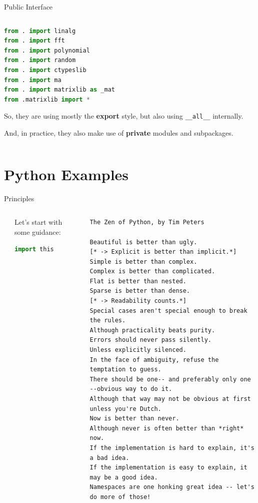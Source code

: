 \documentclass[9pt]{beamer}
\begin{document}
\begin{frame}[fragile]{Public Interface}
\begin{columns}
\begin{column}{0.47\textwidth}
\begin{lstlisting}[language=Python,style=mystyle,firstnumber=140]
from . import linalg
from . import fft
from . import polynomial
from . import random
from . import ctypeslib
from . import ma
from . import matrixlib as _mat
from .matrixlib import *\end{lstlisting}
        So, they are using mostly the \textbf{export} style, but also using
        \texttt{\_\_all\_\_} internally.
        \begin{flushright}
            \footnotesize
            \hspace*{15em}And, in practice, they also make use of
            \textbf{private} modules and subpackages.
        \end{flushright}
        \end{column}
    \end{columns}
\end{frame}

\section{Python Examples}


\begin{frame}[fragile]{Principles}
    \vspace*{20pt}
    \begin{columns}
        \begin{column}{0.02\textwidth}
        \end{column}
        \begin{column}{0.38\textwidth}
            Let's start with some guidance:
            \begin{lstlisting}[language=Python,style=mystyle]
import this\end{lstlisting}
        \end{column}
        \begin{column}{0.6\textwidth}
            \begin{lstlisting}[style=mystyle]
The Zen of Python, by Tim Peters

Beautiful is better than ugly.
[* -> Explicit is better than implicit.*]
Simple is better than complex.
Complex is better than complicated.
Flat is better than nested.
Sparse is better than dense.
[* -> Readability counts.*]
Special cases aren't special enough to break the rules.
Although practicality beats purity.
Errors should never pass silently.
Unless explicitly silenced.
In the face of ambiguity, refuse the temptation to guess.
There should be one-- and preferably only one --obvious way to do it.
Although that way may not be obvious at first unless you're Dutch.
Now is better than never.
Although never is often better than *right* now.
If the implementation is hard to explain, it's a bad idea.
If the implementation is easy to explain, it may be a good idea.
Namespaces are one honking great idea -- let's do more of those!\end{lstlisting}
        \end{column}
    \end{columns}
\end{frame}
\end{document}
